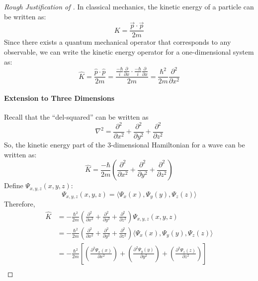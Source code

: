\begin{proof}[Rough Justification of ]
		In classical mechanics, the kinetic energy of a particle can be written as:
		\begin{equation*}
			K = \frac{\vec{p} \cdot \vec{p}}{2m}
		\end{equation*}
		Since there exists a quantum mechanical operator that corresponds to any observable, we can write the kinetic energy operator for a one-dimensional system as:
		\begin{equation*}
			\widehat{K} = \frac{\hat{p} \cdot \hat{p}}{2m}
			= \frac{\frac{-\hbar}{i} \frac{\partial}{\partial x} \cdot \frac{-\hbar}{i} \frac{\partial}{\partial x}}{2m}
			= \frac{\hbar^{2}}{2m} \frac{\partial^{2}}{\partial x^{2}}
		\end{equation*}
		\paragraph{Extension to Three Dimensions} \label{par:Extension to Three Dimensions}
		Recall that the ``del-squared'' can be written as
		\begin{equation*}
			\nabla^{2} = \frac{\partial^{2}}{\partial x^{2}} + \frac{\partial^{2}}{\partial y^{2}} + \frac{\partial^{2}}{\partial z^{2}}
		\end{equation*}
		So, the kinetic energy part of the 3-dimensional Hamiltonian for a wave can be written as:
		\begin{equation*}
			\widehat{K} =  \frac{-\hbar}{2m} \left( \frac{\partial^{2}}{\partial x^{2}} + \frac{\partial^{2}}{\partial y^{2}} + \frac{\partial^{2}}{\partial z^{2}} \right)
		\end{equation*}
		Define $\Psi_{x,y,z} \left( x,y,z \right)$:
		\begin{equation*}
			\Psi_{x,y,z} \left( x,y,z \right) = \langle \Psi_{x} \left( x \right),\Psi_{y} \left( y \right),\Psi_{z} \left( z \right) \rangle
		\end{equation*}
		Therefore, 
		\begin{align*}
			\widehat{K}
			&= -\frac{\hbar^{2}}{2m} \left( \frac{\partial^{2}}{\partial x^{2}} + \frac{\partial^{2}}{\partial y^{2}}  + \frac{\partial^{2}}{\partial z^{2}} \right) \Psi_{x,y,z} \left( x,y,z \right) \\
			&= -\frac{\hbar^{2}}{2m} \left( \frac{\partial^{2}}{\partial x^{2}} + \frac{\partial^{2}}{\partial y^{2}}  + \frac{\partial^{2}}{\partial z^{2}} \right) \langle \Psi_{x} \left( x \right),\Psi_{y} \left( y \right),\Psi_{z} \left( z \right) \rangle \\
			&= -\frac{\hbar^{2}}{2m} \left[ \left( \frac{\partial^{2} \Psi_{x} \left( x \right)}{\partial x^{2}} \right) + \left(\frac{\partial^{2} \Psi_{y} \left( y \right)}{\partial y^{2}}\right) + \left(\frac{\partial^{2} \Psi_{z} \left( z \right)}{\partial z^{2}}\right) \right] \\
		\end{align*}
	\end{proof}